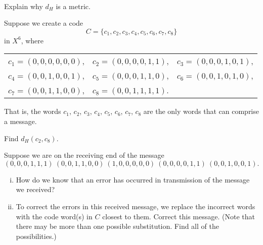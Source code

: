 \begin{activity} ~

\ba 
\item Explain why $d_H$ is a metric.

\item Suppose we create a code
\[C = \{c_1,c_2,c_3,c_4,c_5,c_6,c_7,c_8\}\] 
in $X^6$, where  
\begin{center}
\begin{tabular}{lll}
$c_1 = (0,0,0,0,0,0)$, 	&$c_2=(0,0,0,0,1,1)$, 	&$c_3=(0,0,0,1,0,1)$, 	\\
$c_4=(0,0,1,0,0,1)$, 		&$c_5=(0,0,0,1,1,0)$, 	&$c_6=(0,0,1,0,1,0)$, 	\\
$c_7=(0,0,1,1,0,0)$, 		&$c_8=(0,0,1,1,1,1)$.	&
\end{tabular}
\end{center}
That is, the words $c_1$, $c_2$, $c_3$, $c_4$, $c_5$, $c_6$, $c_7$, $c_8$ are the only words that can comprise a message. 

Find $d_H(c_2, c_8)$.

\item Suppose we are on the receiving end of the message 
\begin{equation*} \label{eq:message}
(0,0,0,1,1,1) \ (0,0,1,1,0,0) \ (1,0,0,0,0,0) \ (0,0,0,0,1,1) \ (0,0,1,0,0,1).
\end{equation*} 
	\begin{enumerate}[i.]
	\item How do we know that an error has occurred in transmission of the message we received?

	\item To correct the errors in this received message, we replace the incorrect words with the code word(s) in $C$ closest to them. Correct this message. (Note that there may be more than one possible substitution. Find all of the possibilities.)
	
		\end{enumerate}
	
\ea

\end{activity}

